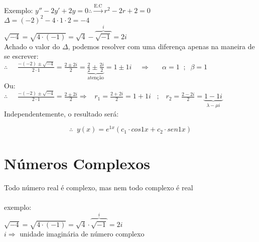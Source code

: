 \documentclass{article}
\begin{document}
{\begin{enumerate}
    Exemplo:
    $y''-2y'+2y=0\therefore \xrightarrow{\text{E.C}} r^2-2r+2=0$\\
    $\Delta = (-2)^2-4\cdot 1\cdot 2=-4$\\

    $\sqrt{-4}=\sqrt{4\cdot(-1)}=\sqrt{4}-\overbrace{\sqrt{-1}}^{i}=2i \hspace{2cm}$\\

    Achado o valor do $\Delta$, podemos resolver com uma diferença apenas na maneira de se escrever:\\

    $\displaystyle \therefore\;\;\;\;\;\frac{-(-2)\pm \sqrt{-4}}{2\cdot 1}=\frac{2 \pm2i}{2}= \underbrace{\frac{2}{2} \pm \frac{2i}{2}}_{\text{atenção}}= 1\pm 1i\;\;\;\;\Rightarrow{} \;\;\;\;\;\;\alpha=1 \;\;;\;\;\beta=1$ \hspace{2.5cm} \\

    Ou:\\

    $\therefore \displaystyle\;\;\;\;\;\frac{-(-2)\pm \sqrt{-4}}{2\cdot 1}=\frac{2 \pm2i}{2} \Rightarrow{}\;\;\; r_1=\frac{2+2i}{2}=1+1i \;\;\;;\;\;\; r_2=\frac{2-2i}{2}=\underbrace{1-1i}_{\lambda - \mu i}$\\

       
    Independentemente, o resultado será:

    \[\therefore \;\;y(x)= e^{1 x}(c_1\cdot cos1 x + c_2\cdot  sen1 x)\]
\section{Números Complexos}
Todo número real é complexo, mas nem todo complexo é real\\

\\


exemplo:\\
 $\sqrt{-4}=\sqrt{4\cdot(-1)}=\sqrt{4}\cdot\overbrace{\sqrt{-1}}^{i}=\boxed{2i} \hspace{2cm}$\\
 $i\Rightarrow{}$ unidade imaginária de número complexo\\
 


 \\


\end{enumerate}}
\end{document}
